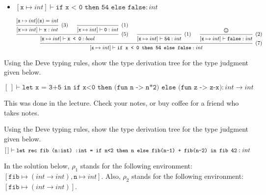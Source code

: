 \documentclass[addpoints]{exam}
\newcommand{\TJDG}[3]{#1 \vdash #2 : #3}
\begin{document}
\begin{questions}
\begin{itemize}
  \item $\TJDG{[\texttt{x}\mapsto int]}{\texttt{if x < 0 then 54 else false}}{int}$
    \begin{solutionbox}{3cm}
      \[\small
      \begin{prooftree}
            \hypo{[\texttt{x}\mapsto int](\texttt{x}) = int}
            \infer1[(3)]{\TJDG{[\texttt{x}\mapsto int]}{\texttt{x}}{int}}
            \infer0[(1)]{\TJDG{[\texttt{x}\mapsto int]}{\texttt{0}}{int}}
          \infer2[(5)]{\TJDG{[\texttt{x}\mapsto int]}{\texttt{x < 0}}{bool}}
          \infer0[(1)]{\TJDG{[\texttt{x}\mapsto int]}{\texttt{54}}{int}}
            \hypo{\textrm{\normalsize\Frowny}}
          \infer1[(2)]{\TJDG{[\texttt{x}\mapsto int]}{\texttt{false}}{int}}
        \infer3[(7)]{\TJDG{[\texttt{x}\mapsto int]}{\texttt{if x < 0 then 54 else false}}{int}}
      \end{prooftree}
      \]
    \end{solutionbox}
    
  \end{itemize}


  \question
  Using the Deve typing rules,
  show the type derivation tree for the type judgment
  given below.

  \[
  \TJDG{[\,]}{\texttt{let x = 3+5 in if x<0 then (fun n -> n*2) else (fun z -> z-x)}}{int \to int}
  \]

  \begin{solutionbox}{1.5cm}
    This was done in the lecture. Check your notes, or buy coffee for a friend who takes notes.
  \end{solutionbox}

  \newpage
  \question
  Using the Deve typing rules,
  show the type derivation tree for the type judgment
  given below.
  \[
  \small
  \TJDG{[\,]}{\texttt{let rec fib (n:int) :int = if n<2 then n else fib(n-1) + fib(n-2) in fib 42}}{int} 
  \]

  \begin{solutionbox}{20cm}
    In the solution below, $\rho_1$ stands for the following environment:
    $[\texttt{fib}\mapsto (int \to int), \texttt{n} \mapsto int]$. Also,
    $\rho_2$ stands for the following environment:
    $[\texttt{fib}\mapsto (int \to int)]$.


\end{solutionbox}
\end{questions}
\end{document}
